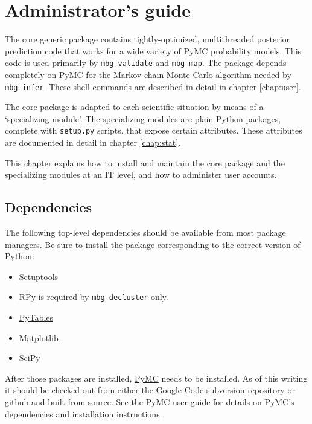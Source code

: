 \chapter{Administrator's guide} 
\label{chap:admin} 

The core generic package contains tightly-optimized, multithreaded posterior prediction code that works for a wide variety of PyMC probability models. This code is used primarily by \texttt{mbg-validate} and \texttt{mbg-map}. The package depends completely on PyMC for the Markov chain Monte Carlo algorithm needed by \texttt{mbg-infer}. These shell commands are described in detail in chapter \ref{chap:user}.

The core package is adapted to each scientific situation by means of a `specializing module'. The specializing modules are plain Python packages, complete with \texttt{setup.py} scripts, that expose certain attributes. These attributes are documented in detail in chapter \ref{chap:stat}.

\bigskip
This chapter explains how to install and maintain the core package and the specializing modules at an IT level, and how to administer user accounts.

\section{Dependencies}

The following top-level dependencies should be available from most package managers. Be sure to install the package corresponding to the correct version of Python:
\begin{itemize}
    \item \href{http://pypi.python.org/pypi/setuptools}{Setuptools} 
    \item \href{http://rpy.sourceforge.net}{RPy} is required by \texttt{mbg-decluster} only. 
    \item \href{http://www.pytables.org}{PyTables}
    \item \href{http://matplotlib.sourceforge.net}{Matplotlib}  
    \item \href{http://www.scipy.org}{SciPy} 
\end{itemize}

After those packages are installed, \href{http://code.google.com/p/pymc}{PyMC} needs to be installed. As of this writing it should be checked out from either the Google Code subversion repository or \href{http://github.com/pymc-devs/pymc}{github} and built from source. See the PyMC user guide for details on PyMC's dependencies and installation instructions.

